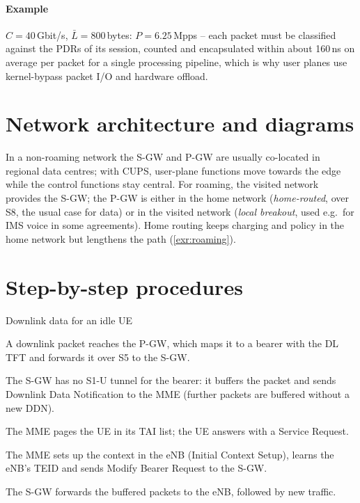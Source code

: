 \documentclass[11pt,a4paper]{article}
\begin{document}
\paragraph{Example} $C = 40$\,Gbit/s, $\bar L = 800$\,bytes: $P = 6.25$\,Mpps -- each packet must be classified
against the PDRs of its session, counted and encapsulated within about 160\,ns on average per packet for a
single processing pipeline, which is why user planes use kernel-bypass packet I/O and hardware offload.

\section{Network architecture and diagrams}
In a non-roaming network the S-GW and P-GW are usually co-located in regional data centres; with CUPS,
user-plane functions move towards the edge while the control functions stay central. For roaming, the
visited network provides the S-GW; the P-GW is either in the home network (\emph{home-routed}, over S8,
the usual case for data) or in the visited network (\emph{local breakout}, used e.g.\ for IMS voice in
some agreements). Home routing keeps charging and policy in the home network but lengthens the path
(\cref{exr:roaming}).

\section{Step-by-step procedures}

\begin{procedurebox}{Downlink data for an idle UE}\label{proc:ddn}
\begin{steps}
  \item A downlink packet reaches the P-GW, which maps it to a bearer with the DL TFT and forwards it over
        S5 to the S-GW.
  \item The S-GW has no S1-U tunnel for the bearer: it buffers the packet and sends Downlink Data
        Notification to the MME (further packets are buffered without a new DDN).
  \item The MME pages the UE in its TAI list; the UE answers with a Service Request.
  \item The MME sets up the context in the eNB (Initial Context Setup), learns the eNB's TEID and sends
        Modify Bearer Request to the S-GW.
  \item The S-GW forwards the buffered packets to the eNB, followed by new traffic.
\end{steps}
\end{procedurebox}
\end{document}
